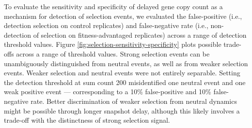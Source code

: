 

To evaluate the sensitivity and specificity of delayed gene copy count as a mechanism for detection of selection events, we evaluated the false-positive (i.e., detection selection on control replicates) and false-negative rate (i.e., non-detection of selection on fitness-advantaged replicates) across a range of detection threshold values.
Figure \ref{fig:selection-sensitivity-specificity} plots possible trade-offs across a range of threshold values.
Strong selection events can be unambiguously distinguished from neutral events, as well as from weaker selection events.
Weaker selection and neutral events were not entirely separable.
Setting the detection threshold at sum count 200 misidentified one neutral event and one weak positive event --- corresponding to a 10\% false-positive and 10\% false-negative rate.
Better discrimination of weaker selection from neutral dynamics might be possible through longer snapshot delay, although this likely involves a trade-off with the distinctness of strong selection signal.
